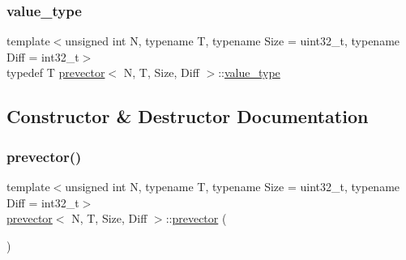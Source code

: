 \mbox{\label{classprevector_aaab8519e15c3bdebdcc4bbc86fcff33c}} 
\subsubsection{\texorpdfstring{value\+\_\+type}{value\_type}}
{\footnotesize\ttfamily template$<$unsigned int N, typename T, typename Size = uint32\+\_\+t, typename Diff = int32\+\_\+t$>$ \\
typedef T \mbox{\hyperlink{classprevector}{prevector}}$<$ N, T, Size, Diff $>$\+::\mbox{\hyperlink{classprevector_aaab8519e15c3bdebdcc4bbc86fcff33c}{value\+\_\+type}}}



\subsection{Constructor \& Destructor Documentation}
\mbox{\label{classprevector_a176a8db0d60ddd8cfc3ea70413f7c1c0}} 
\subsubsection{\texorpdfstring{prevector()}{prevector()}\hspace{0.1cm}{\footnotesize\ttfamily [1/5]}}
{\footnotesize\ttfamily template$<$unsigned int N, typename T, typename Size = uint32\+\_\+t, typename Diff = int32\+\_\+t$>$ \\
\mbox{\hyperlink{classprevector}{prevector}}$<$ N, T, Size, Diff $>$\+::\mbox{\hyperlink{classprevector}{prevector}} (\begin{DoxyParamCaption}{ }\end{DoxyParamCaption})\hspace{0.3cm}{\ttfamily [inline]}}

\mbox{\label{classprevector_a0c428e879c43daac251d6fbbc2ab7b54}} 
